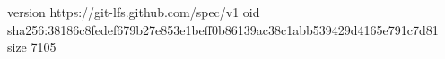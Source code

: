 version https://git-lfs.github.com/spec/v1
oid sha256:38186c8fedef679b27e853e1beff0b86139ac38c1abb539429d4165e791c7d81
size 7105
